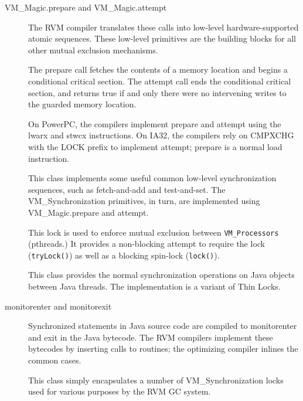 \begin{description}

\item[VM\_Magic.prepare and VM\_Magic.attempt]

The RVM compiler translates these 
calls into low-level
hardware-supported atomic sequences.  These low-level primitives are the 
building blocks for all other mutual exclusion mechanisms. 

The prepare call fetches the
contents of a memory location and begins a conditional critical section.
The attempt call ends the conditional critical section, and returns true
if and only there were no intervening writes to the guarded memory
location.

On PowerPC, the compilers implement prepare and attempt using the lwarx
and stwcx instructions.  On IA32, the compilers rely on CMPXCHG with the
LOCK prefix to implement attempt; prepare is a normal load instruction.

\item[]

This class implements some useful common low-level synchronization
sequences, such as fetch-and-add and test-and-set.  The VM\_Synchronization
primitives, in turn, are implemented using VM\_Magic.prepare and attempt.

\item[]%

This lock is used to enforce mutual exclusion between {\tt VM\_Processors}
(pthreads.)  It provides a non-blocking attempt to require the lock
({\tt tryLock()}) as well as a blocking spin-lock ({\tt lock()}).

\item[]%

This class provides the normal synchronization operations on Java objects
between Java threads.  The implementation is a variant of Thin Locks.

\item[monitorenter and monitorexit]

Synchronized statements in Java source code are compiled to monitorenter
and exit in the Java bytecode.  The RVM compilers implement these
bytecodes by inserting calls to  routines; 
the optimizing
compiler inlines the common cases.

\item[]%

This class simply encapsulates a number of VM\_Synchronization locks 
used for various purposes by the RVM GC system.

\end{description}

